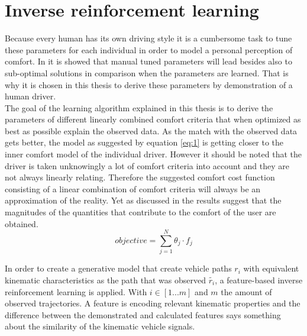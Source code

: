 \section{Inverse reinforcement learning}
Because every human has its own driving style it is a cumbersome task to tune these parameters for each individual in order to model a personal perception of comfort. In \cite{Powers} it is showed that manual tuned parameters will lead besides also to sub-optimal solutions in comparison when the parameters are learned.  That is why it is chosen in this thesis to derive these parameters by demonstration of a human driver.\\

The goal of the learning algorithm explained in this thesis is to derive the parameters of different linearly combined comfort criteria that when optimized as best as possible explain the observed data. As the match with the observed data gets better, the model as suggested by equation \ref{eq:1} is getting closer to the inner comfort model of the individual driver. However it should be noted that the driver is taken unknowingly a lot of comfort criteria into account and they are not always linearly relating. Therefore the suggested comfort cost function consisting of a linear combination of comfort criteria will always be an approximation of the reality. Yet as discussed in \cite{Kuderer2015a} the results suggest that the magnitudes of the quantities that contribute to the comfort of the user are obtained.\\

\begin{equation}\label{eq:1}
	objective = \sum_{j=1}^{N}\theta_j\cdot f_j	
\end{equation}



In order to create a generative model that create vehicle paths $r_i$ with equivalent kinematic characteristics as the path that was observed $\tilde{r_i}$, a feature-based inverse reinforcement learning is applied. \cite{Kuderer2015a,Abbeel2004} With $i \in [1 ... m]$ and $m$ the amount of observed trajectories. A feature is encoding relevant kinematic properties and the difference between the demonstrated and calculated features says something about the similarity of the kinematic vehicle signals. \\

